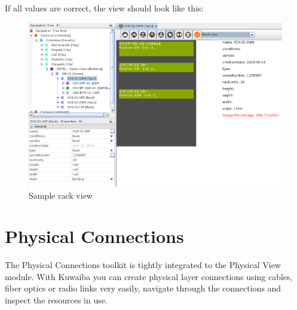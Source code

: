 \documentclass[a4paper]{article}
\begin{document}
		If all values are correct, the view should look like this:
		\begin{figure}[h!]
			\centering
			\includegraphics[width=0.9\linewidth]{img/rack_view_sample_view.png}
			\caption{Sample rack view}
			\label{fig:rack_view_sample_view}
		\end{figure}
		
	\newpage
	\section{Physical Connections} \label{sec:physical_connections}
		The Physical Connections toolkit is tightly integrated to the Physical View module. With Kuwaiba you can create physical layer connections using cables, fiber optics or radio links very easily, navigate through the connections and inspect the resources in use.\newline
		
\end{document}
